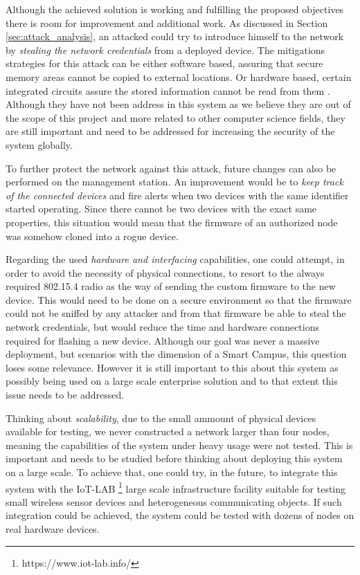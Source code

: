 Although the achieved solution is working and fulfilling the proposed objectives there is room for improvement and additional work. As discussed in Section \ref{sec:attack_analysis}, an attacked could try to introduce himself to the network by \emph{stealing the network credentials} from a deployed device. The mitigations strategies for this attack can be either software based,  assuring that secure memory areas cannot be copied to external locations. Or hardware based, certain integrated circuits assure the stored information cannot be read from them \cite{Lesjak2014}. Although they have not been address in this system as we believe they are out of the scope of this project and more related to other computer science fields, they are still important and need to be addressed for increasing the security of the system globally.\par 
To further protect the network against this attack, future changes can also be performed on the management station. An improvement would be to \emph{keep track of the connected devices} and fire alerts when two devices with the same identifier started operating. Since there cannot be two devices with the exact same properties, this situation would mean that the firmware of an authorized node was somehow cloned into a rogue device.\par
Regarding the used \emph{hardware and interfacing} capabilities, one could attempt, in order to avoid the necessity of physical connections, to resort to the always required 802.15.4 radio as the way of sending the custom firmware to the new device. This would need to be done on a secure environment so that the firmware could not be sniffed by any attacker and from that firmware be able to steal the network credentials, but would reduce the time and hardware connections required for flashing a new device. Although our goal was never a massive deployment, but scenarios with the dimension of a Smart Campus, this question loses some relevance. However it is still important to this about this system as possibly being used on a large scale enterprise solution and to that extent this issue needs to be addressed.\par
Thinking about \emph{scalability}, due to the small ammount of physical devices available for testing, we never constructed a network larger than four nodes, meaning the capabilities of the system under heavy usage were not tested. This is important and needs to be studied before thinking about deploying this system on a large scale. To achieve that, one could try, in the future, to integrate this system with the IoT-LAB \footnote{https://www.iot-lab.info/} large scale infrastructure facility suitable for testing small wireless sensor devices and heterogeneous communicating objects. If such integration could be achieved, the system could be tested with dozens of nodes on real hardware devices.


